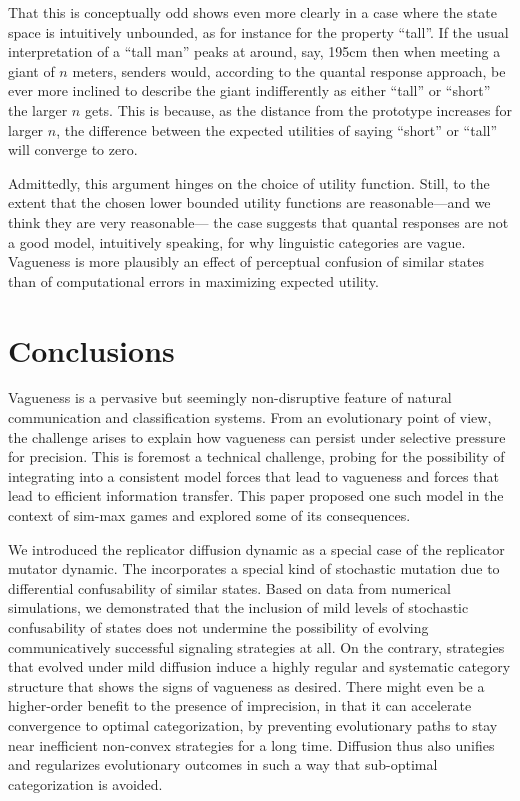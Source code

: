 \documentclass[fleqn,reqno,10pt]{article}
\newcommand{\rdd}{\acro{rdd}} %
\begin{document}
That this is conceptually odd shows even more clearly in a case where
the state space is intuitively unbounded, as for instance for the
property ``tall''. If the usual interpretation of a ``tall man'' peaks
at around, say, 195cm then when meeting a giant of $n$ meters, senders
would, according to the quantal response approach, be ever more
inclined to describe the giant indifferently as either ``tall'' or
``short'' the larger $n$ gets. This is because, as the distance from
the prototype increases for larger $n$, the difference between the
expected utilities of saying ``short'' or ``tall'' will converge to
zero. 

Admittedly, this argument hinges on the choice of utility
function. Still, to the extent that the chosen lower bounded utility
functions are reasonable---and we think they are very reasonable---
the case suggests that quantal responses are not a good model,
intuitively speaking, for why linguistic categories are
vague. Vagueness is more plausibly an effect of perceptual confusion
of similar states than of computational errors in maximizing expected
utility.


\section{Conclusions}
\label{sec:conclusions}

Vagueness is a pervasive but seemingly non-disruptive feature of
natural communication and classification systems. From an evolutionary
point of view, the challenge arises to explain how vagueness can
persist under selective pressure for precision. This is foremost a
technical challenge, probing for the possibility of integrating into a
consistent model forces that lead to vagueness and forces that lead
to efficient information transfer. This paper proposed one such model
in the context of sim-max games and explored some of its consequences.

We introduced the replicator diffusion dynamic as a special case of
the replicator mutator dynamic. The \rdd incorporates a special kind
of stochastic mutation due to differential confusability of similar
states. Based on data from numerical simulations, we demonstrated that
the inclusion of mild levels of stochastic confusability of states
does not undermine the possibility of evolving communicatively
successful signaling strategies at all. On the contrary, strategies
that evolved under mild diffusion induce a highly regular and
systematic category structure that shows the signs of vagueness as
desired. There might even be a higher-order benefit to the presence of
imprecision, in that it can accelerate convergence to optimal
categorization, by preventing evolutionary paths to stay near
inefficient non-convex strategies for a long time. Diffusion thus also
unifies and regularizes evolutionary outcomes in such a way that
sub-optimal categorization is avoided. 
\end{document}
